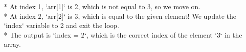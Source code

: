 \documentclass[preview]{standalone}
\begin{document}
* At index 1, `arr[1]` is 2, which is not equal to 3, so we move on.\\* At index 2, `arr[2]` is 3, which is equal to the given element! We update the `index` variable to 2 and exit the loop.\\* The output is `index = 2`, which is the correct index of the element `3` in the array.\\
\end{document}
